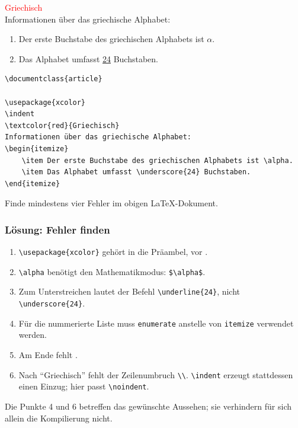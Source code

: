\begin{frame}[fragile]
\begin{myexercise}
\textcolor{red}{Griechisch}\\
Informationen über das griechische Alphabet:
\begin{enumerate}
    \item Der erste Buchstabe des griechischen Alphabets ist $\alpha$.
    \item Das Alphabet umfasst \underline{24} Buchstaben.
\end{enumerate}

\begin{lstlisting}[style=LaTeX, basicstyle=\scriptsize\ttfamily]
\documentclass{article}

\usepackage{xcolor}
\indent
\textcolor{red}{Griechisch}
Informationen über das griechische Alphabet:
\begin{itemize}
    \item Der erste Buchstabe des griechischen Alphabets ist \alpha.
    \item Das Alphabet umfasst \underscore{24} Buchstaben.
\end{itemize}
\end{lstlisting}
Finde mindestens vier Fehler im obigen \LaTeX-Dokument.
\end{myexercise}
\end{frame}

\begin{frame}[fragile]
\frametitle{Lösung: Fehler finden}
\small
\begin{enumerate}
    \item \lstinline[style=LaTeX]|\usepackage{xcolor}| gehört in die Präambel, vor \lstinline[style=LaTeX]||.
    \item \lstinline[style=LaTeX]|\alpha| benötigt den Mathematikmodus: \lstinline[style=LaTeX]|$\alpha$|.
    \item Zum Unterstreichen lautet der Befehl \lstinline[style=LaTeX]|\underline{24}|, nicht \lstinline[style=LaTeX]|\underscore{24}|.
    \item Für die nummerierte Liste muss \texttt{enumerate} anstelle von \texttt{itemize} verwendet werden.
    \item Am Ende fehlt \lstinline[style=LaTeX]||.
    \item Nach \enquote{Griechisch} fehlt der Zeilenumbruch \lstinline[style=LaTeX]|\\|. \lstinline[style=LaTeX]|\indent| erzeugt stattdessen einen Einzug; hier passt \lstinline[style=LaTeX]|\noindent|.
\end{enumerate}
Die Punkte 4 und 6 betreffen das gewünschte Aussehen; sie verhindern für sich allein die Kompilierung nicht.
\end{frame}


